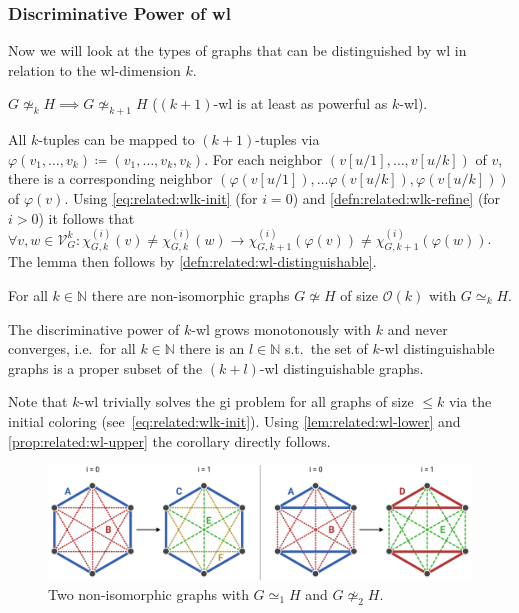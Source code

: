 \subsubsection{Discriminative Power of \acs{wl}}
Now we will look at the types of graphs that can be distinguished by \acs{wl} in relation to the \acs{wl}-dimension $k$.
\begin{lem}\label{lem:related:wl-lower}
	$G \mathrel{\not\simeq_k} H \implies G \mathrel{\not\simeq_{k+1}} H$ ($(k+1)$-\acs{wl} is at least as powerful as $k$-\acs{wl}).
\end{lem}
\begin{hproof}
	All $k$-tuples can be mapped to $(k+1)$-tuples via $\varphi(v_1, \dots, v_k) \coloneqq (v_1, \dots,\allowbreak v_k, v_k)$.
	For each neighbor $(v[u/1], \dots,\allowbreak v[u/k])$ of $v$, there is a corresponding neighbor $(\varphi(v[u/1]), \dots \varphi(v[u/k]), \varphi(v[u/k]))$ of $\varphi(v)$.
	Using \cref{eq:related:wlk-init} (for $i = 0$) and \cref{defn:related:wlk-refine} (for $i > 0$) it follows that $\forall v, w \in \mathcal{V}_G^k: \chi_{G, k}^{(i)}(v) \neq \chi_{G, k}^{(i)}(w) \rightarrow \chi_{G, k+1}^{(i)}(\varphi(v)) \neq \chi_{G, k+1}^{(i)}(\varphi(w))$.
	The lemma then follows by \cref{defn:related:wl-distinguishable}.
\end{hproof}
\begin{prop}\label{prop:related:wl-upper}
	For all $k \in \mathbb{N}$ there are non-isomorphic graphs $G \not\simeq H$ of size $\mathcal{O}(k)$ with $G \mathrel{\simeq_k} H$.
\end{prop}
\begin{cor}\label{cor:related:wl-monotonous}
	The discriminative power of $k$-\acs{wl} grows monotonously with $k$ and never converges, i.e.\ for all $k \in \mathbb{N}$ there is an $l \in \mathbb{N}$ s.t.\ the set of $k$-\ac{wl} distinguishable graphs is a proper subset of the $(k+l)$-\ac{wl} distinguishable graphs.
\end{cor}
\begin{hproof}
	Note that $k$-\acs{wl} trivially solves the \ac{gi} problem for all graphs of size $\leq k$ via the initial coloring (see~\cref{eq:related:wlk-init}).
	Using \cref{lem:related:wl-lower} and \cref{prop:related:wl-upper} the corollary directly follows.
\end{hproof}
\begin{figure}[ht]
	\centering
	\includegraphics[width=\linewidth]{gfx/related-work/wl2-problem-solution.pdf}
	\caption{
		Two non-isomorphic graphs with $G \mathrel{\simeq_1} H$ and $G \mathrel{\not\simeq_2} H$.
	}\label{fig:related:wl2-problem-solution}
\end{figure}
